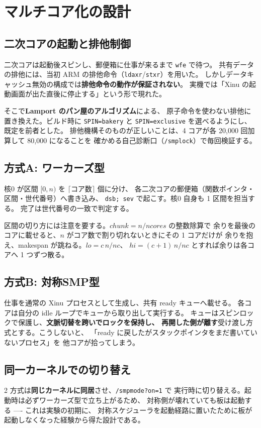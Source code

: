 \documentclass[a4paper,11pt]{ltjsarticle}
\begin{document}
\section{マルチコア化の設計}\label{sec:design}

\subsection{二次コアの起動と排他制御}
二次コアは起動後スピンし、郵便箱に仕事が来るまで \texttt{wfe} で待つ。
共有データの排他には、当初 ARM の排他命令（\texttt{ldaxr}/\texttt{stxr}）を用いた。
しかしデータキャッシュ無効の構成では\textbf{排他命令の動作が保証されない}。
実機では「Xinu の起動画面が出た直後に停止する」という形で現れた。

そこで\textbf{Lamport のパン屋のアルゴリズム}\cite{bakery}による、
原子命令を使わない排他に置き換えた。ビルド時に \texttt{SPIN=bakery} と
\texttt{SPIN=exclusive} を選べるようにし、既定を前者とした。
排他機構そのものが正しいことは、4 コアが各 20{,}000 回加算して 80{,}000 になることを
確かめる自己診断口（\texttt{/smplock}）で毎回検証する。

\subsection{方式A: ワーカーズ型}
核0 が区間 $[0,n)$ を $\lceil$コア数$\rceil$ 個に分け、
各二次コアの郵便箱（関数ポインタ・区間・世代番号）へ書き込み、
\texttt{dsb; sev} で起こす。核0 自身も 1 区間を担当する。
完了は世代番号の一致で判定する。

区間の切り方には注意を要する。$\mathit{chunk} = n/\mathit{ncores}$ の整数除算で
余りを最後のコアに載せると、$n$ がコア数で割り切れないときにその 1 コアだけが
余りを抱え、makespan が跳ねる。$\mathit{lo} = c\,n/\mathit{nc}$、
$\mathit{hi} = (c{+}1)\,n/\mathit{nc}$ とすれば余りは各コアへ 1 つずつ散る。

\subsection{方式B: 対称SMP型}
仕事を通常の Xinu プロセスとして生成し、共有 ready キューへ載せる。
各コアは自分の idle ループでキューから取り出して実行する。
キューはスピンロックで保護し、\textbf{文脈切替を跨いでロックを保持し、
再開した側が離す}受け渡し方式とする。こうしないと、
「ready に戻したがスタックポインタをまだ書いていないプロセス」を
他コアが拾ってしまう。

\subsection{同一カーネルでの切り替え}
2 方式は\textbf{同じカーネルに同居}させ、\texttt{/smpmode?on=1} で
実行時に切り替える。起動時は必ずワーカーズ型で立ち上がるため、
対称側が壊れていても板は起動する ---- これは実験の初期に、
対称スケジューラを起動経路に置いたために板が起動しなくなった経験から得た設計である。
\end{document}
